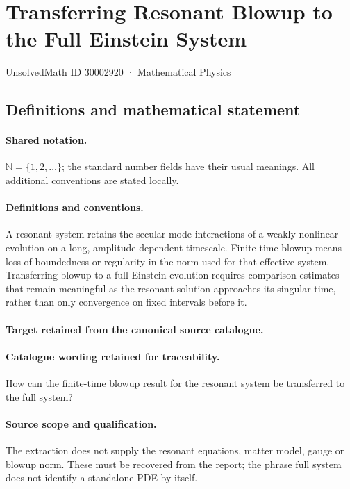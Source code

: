 \documentclass[11pt]{article}
\begin{document}
\setcounter{section}{30002919}
\section{Transferring Resonant Blowup to the Full Einstein System}\label{30002920}
{\small UnsolvedMath ID 30002920 · Mathematical Physics}
\subsection{Definitions and mathematical statement}

\paragraph{Shared notation.}$\mathbb N=\{1,2,\ldots\}$; the standard number fields have their usual meanings. All additional conventions are stated locally.


\paragraph{Definitions and conventions.}
A resonant system retains the secular mode interactions of a weakly nonlinear evolution on a long, amplitude-dependent timescale. Finite-time blowup means loss of boundedness or regularity in the norm used for that effective system. Transferring blowup to a full Einstein evolution requires comparison estimates that remain meaningful as the resonant solution approaches its singular time, rather than only convergence on fixed intervals before it.

\paragraph{Target retained from the canonical source catalogue.}
\paragraph{Catalogue wording retained for traceability.}
How can the finite-time blowup result for the resonant system be transferred to the full system?

\paragraph{Source scope and qualification.}
The extraction does not supply the resonant equations, matter model, gauge or blowup norm. These must be recovered from the report; the phrase full system does not identify a standalone PDE by itself.
\end{document}
